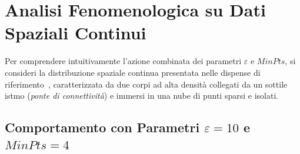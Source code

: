 \section{Analisi Fenomenologica su Dati Spaziali Continui}
\label{sec:dm-dbscan-spatial-analysis}

Per comprendere intuitivamente l'azione combinata dei parametri $\varepsilon$ e $MinPts$, si consideri la distribuzione spaziale continua presentata nelle dispense di riferimento~\cite{tan2018}, caratterizzata da due corpi ad alta densità collegati da un sottile istmo (\textit{ponte di connettività}) e immersi in una nube di punti sparsi e isolati.

\subsection{Comportamento con Parametri \texorpdfstring{$\varepsilon = 10$ e $MinPts = 4$}{Eps = 10 e MinPts = 4}}

